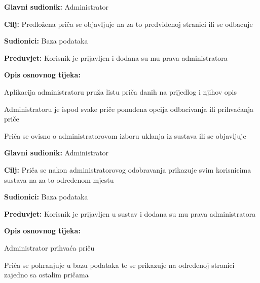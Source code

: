 					\noindent {}
				\begin{packed_item}
					
					\item \textbf{Glavni sudionik: }Administrator
					\item  \textbf{Cilj:} Predložena priča se objavljuje na za to predviđenoj stranici ili se odbacuje
					\item  \textbf{Sudionici:} Baza podataka
					\item  \textbf{Preduvjet:} Korisnik je prijavljen i dodana su mu prava administratora
					\item  \textbf{Opis osnovnog tijeka:}
					
					\item[] \begin{packed_enum}
						
						\item Aplikacija administratoru pruža listu priča danih na prijedlog i njihov opis
						\item Administratoru je ispod svake priče ponuđena opcija odbacivanja ili prihvaćanja priče
						\item Priča se ovisno o administratorovom izboru uklanja iz sustava ili se objavljuje
					\end{packed_enum}
				\end{packed_item}
			
					\noindent \underbar{\textbf{UC8 $-$ Objava priče}}
				\begin{packed_item}
					
					\item \textbf{Glavni sudionik: }Administrator
					\item  \textbf{Cilj:} Priča se nakon administratorovog odobravanja prikazuje svim korisnicima sustava na za to određenom mjestu
					\item  \textbf{Sudionici:} Baza podataka
					\item  \textbf{Preduvjet:} Korisnik je prijavljen u sustav i dodana su mu prava administratora
					\item  \textbf{Opis osnovnog tijeka:}
					
					\item[] \begin{packed_enum}
						
						\item Administrator prihvaća priču
						\item Priča se pohranjuje u bazu podataka te se prikazuje na određenoj stranici zajedno sa ostalim pričama
					\end{packed_enum}
				\end{packed_item}
				
